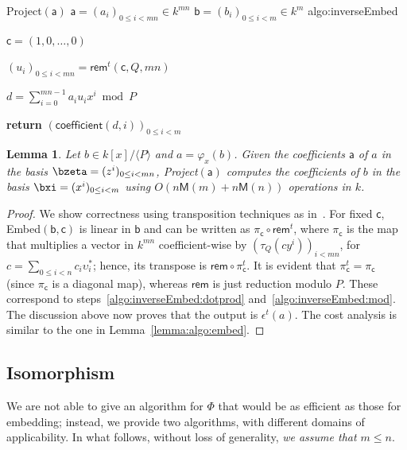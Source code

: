 \documentclass{sig-alternate}
\def\M {\ensuremath{\mathsf{M}}}
\def\va {\ensuremath{\mathsf{a}}}
\def\vb {\ensuremath{\mathsf{b}}}
\def\vc {\ensuremath{\mathsf{c}}}
\def\rem {\ensuremath{\mathsf{rem}}}
\def\coeff {\ensuremath{\mathsf{coefficient}}}
\newcounter{algo}
\newenvironment{algorithm_endline}[4]{\small\begin{center}\begin{minipage}{0.48\textwidth}
      \refstepcounter{algo}
      \label{#4}
      \sf
      \rule{\textwidth}{0.2pt}\\
      \makebox[\textwidth][c]{Algorithm~\arabic{algo}:~\textbf{#1}}\\
      \rule[0.5\baselineskip]{\textwidth}{0.2pt}\\

      \vspace{-12pt}

      \parbox{\textwidth}{\textbf{Input} #2}
      \parbox{\textwidth}{\textbf{Output} #3}

\vspace{-7pt}

      \begin{enumerate*}}{\end{enumerate*}
      \vspace{-11pt}
      \rule{\textwidth}{0.2pt}
\end{minipage}\end{center}
}
\newcommand{\ang}[1]{\langle#1\rangle}
\newtheorem{Lemma}{Lemma}
\begin{document}
\begin{algofloat}[t]
\begin{algorithm_endline}
{Project$(\va)$}
{$\va=(a_i)_{0 \le i < mn} \in k^{mn}$}
{$\vb=(b_i)_{0 \le i < m} \in k^m$}
{algo:inverseEmbed}
\item $\vc=(1,0,\dots,0)$ 
\item  $(u_i)_{0\le i<mn} = \rem^t(\vc,Q,mn)$
\item \label{algo:inverseEmbed:dotprod} $d = \sum_{i=0}^{mn-1} a_i u_i x^i  \bmod P$
\item {\bf return} \label{algo:inverseEmbed:mod} $(\coeff(d,i))_{0 \le i < m}$
\end{algorithm_endline}
\vspace{-5ex}
\end{algofloat}

\begin{Lemma}\label{lemma:project}
  Let $b \in k[x]/\ang{P}$ and $a=\varphi_x(b)$. Given the
  coefficients $\va$ of $a$ in the basis $\bzeta=(z^i)_{0 \le i
    < mn}$, {\sf Project}$(\va)$ computes the coefficients of $b$ in
  the basis $\bxi=(x^i)_{0 \le i < m}$ using $O(n\M(m) + n\M(n))$
  operations in $k$.
\end{Lemma}
\begin{proof}
  We show correctness using transposition techniques as
  in~\cite{bostan+lecerf+schost:tellegen}. For fixed $\vc$,
  {\sf Embed}$(\vb,\vc)$ is linear in $\vb$ and can be written as
  $\pi_\vc\circ\rem^t$, where $\pi_\vc$ is the map that multiplies a
  vector in $k^{mn}$ coefficient-wise by $(\tau_Q(c y^i))_{i<mn}$, for
  $c=\sum_{0 \le i < n} c_i \upsilon^\ast_i$; hence, its transpose is
  $\rem\circ\pi_\vc^t$. It is evident that $\pi_\vc^t=\pi_\vc$ (since
  $\pi_\vc$ is a diagonal map), whereas $\rem$ is just reduction
  modulo $P$. These correspond to
  steps~\ref{algo:inverseEmbed:dotprod}
  and~\ref{algo:inverseEmbed:mod}. The discussion above now proves
  that the output is $\epsilon^t(a)$. The cost analysis is similar to
  the one in Lemma~\ref{lemma:algo:embed}.
\end{proof}


\subsection{Isomorphism} 

We are not able to give an algorithm for $\Phi$ that would be as
efficient as those for embedding; instead, we provide two algorithms,
with different domains of applicability. In what follows, without
loss of generality, {\em we assume that $m\le n$}.
\end{document}
